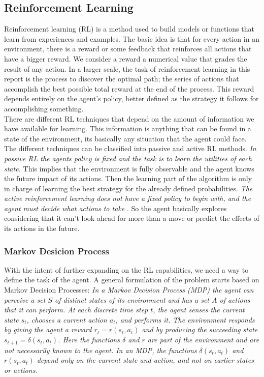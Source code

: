 \subsection*{Reinforcement Learning}

Reinforcement learning (RL) is a method used to build models or functions that learn from experiences and examples. The basic idea is that for every action in an environment, there is a reward or some feedback that reinforces all actions that have a bigger reward. We consider a reward a numerical value that grades the result of any action. In a larger scale, the task of reinforcement learning in this report is the process to discover the optimal path; the series of actions that accomplish the best possible total reward at the end of the process. This reward depends entirely on the agent's policy, better defined as the strategy it follows for accomplishing something. \\


There are different RL techniques that depend on the amount of information we have available for learning. This information is anything that can be found in a state of the environment, its basically any situation that the agent could face. The different techniques can be classified into passive and active RL methods. \textit{In passive RL the agents policy is fixed and the task is to learn the utilities of each state.} \cite[p764]{rl} This implies that the environment is fully observable and the agent knows the future impact of its actions. Then the learning part of the algorithm is only in charge of learning the best strategy for the already defined probabilities. \textit{The active reinforcement learning does not have a fixed policy to begin with, and the agent must decide what actions to take} \cite[p771]{rl}. So the agent basically explores considering that it can't look ahead for more than a move or predict the effects of its actions in the future.\\


\subsubsection{Markov Desicion Process} \label{mdp}

With the intent of further expanding on the RL capabilities, we need a way to define the task of the agent. A general formulation of the problem starts based on Markov Decision Processes: \textit{In a Markov Decision Process (MDP) the agent can perceive a set $S$ of distinct states of its environment and has a set $A$ of actions that it can perform. At each discrete time step $t$, the agent senses the current state $s_t$, chooses a current action $a_t$, and performs it. The environment responds by giving the agent a reward $r_t = r(s_t,a_t)$ and by producing the succeeding state $s_{t+1}= \delta (s_t,a_t)$. Here the functions $\delta$ and $r$ are part of the environment and are not necessarily known to the agent. In an MDP, the functions $\delta (s_t,a_t)$ and $r(s_t,a_t)$ depend only on the current state and action, and not on earlier states or actions.}\cite[p370]{ml_tom_mitchel} \\


